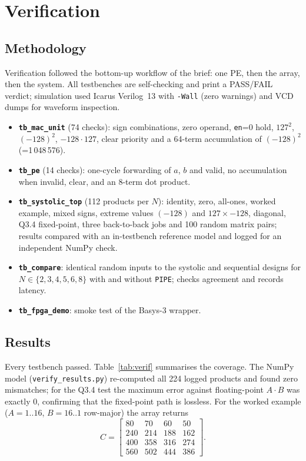 \documentclass[conference]{IEEEtran}
\begin{document}
\section{Verification}

\subsection{Methodology}
Verification followed the bottom-up workflow of the brief: one PE, then the
array, then the system. All testbenches are self-checking and print a
PASS/FAIL verdict; simulation used Icarus Verilog~13 with
\texttt{-Wall} (zero warnings) and VCD dumps for waveform inspection.
\begin{itemize}\setlength{\itemsep}{1pt}
\item \textbf{\texttt{tb\_mac\_unit}} (74 checks): sign combinations, zero
  operand, \texttt{en}=0 hold, $127^2$, $(-128)^2$, $-128\cdot127$, clear
  priority and a 64-term accumulation of $(-128)^2$ (=1\,048\,576).
\item \textbf{\texttt{tb\_pe}} (14 checks): one-cycle forwarding of $a$, $b$
  and valid, no accumulation when invalid, clear, and an 8-term dot product.
\item \textbf{\texttt{tb\_systolic\_top}} (112 products per $N$): identity,
  zero, all-ones, worked example, mixed signs, extreme values $(-128)$ and
  $127\times-128$, diagonal, Q3.4 fixed-point, three back-to-back jobs and 100
  random matrix pairs; results compared with an in-testbench reference model
  and logged for an independent NumPy check.
\item \textbf{\texttt{tb\_compare}}: identical random inputs to the systolic
  and sequential designs for $N\in\{2,3,4,5,6,8\}$ with and without
  \texttt{PIPE}; checks agreement and records latency.
\item \textbf{\texttt{tb\_fpga\_demo}}: smoke test of the Basys-3 wrapper.
\end{itemize}

\subsection{Results}
Every testbench passed. Table~\ref{tab:verif} summarises the coverage. The
NumPy model (\texttt{verify\_results.py}) re-computed all 224 logged products
and found zero mismatches; for the Q3.4 test the maximum error against
floating-point $A\cdot B$ was exactly 0, confirming that the fixed-point path
is lossless. For the worked example ($A=1..16$, $B=16..1$ row-major) the array
returns
\[
C=\begin{bmatrix}80&70&60&50\\240&214&188&162\\400&358&316&274\\560&502&444&386\end{bmatrix}.
\]
\end{document}

